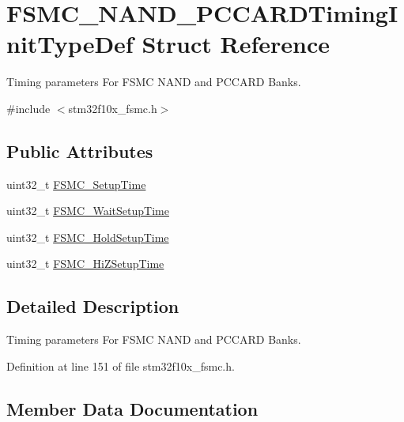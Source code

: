 \hypertarget{struct_f_s_m_c___n_a_n_d___p_c_c_a_r_d_timing_init_type_def}{}\section{F\+S\+M\+C\+\_\+\+N\+A\+N\+D\+\_\+\+P\+C\+C\+A\+R\+D\+Timing\+Init\+Type\+Def Struct Reference}
\label{struct_f_s_m_c___n_a_n_d___p_c_c_a_r_d_timing_init_type_def}


Timing parameters For F\+S\+MC N\+A\+ND and P\+C\+C\+A\+RD Banks.  




{\ttfamily \#include $<$stm32f10x\+\_\+fsmc.\+h$>$}

\subsection*{Public Attributes}
\begin{DoxyCompactItemize}
\item 
uint32\+\_\+t \hyperlink{struct_f_s_m_c___n_a_n_d___p_c_c_a_r_d_timing_init_type_def_a31632aeb49269a29a39e3b191590b6dc}{F\+S\+M\+C\+\_\+\+Setup\+Time}
\item 
uint32\+\_\+t \hyperlink{struct_f_s_m_c___n_a_n_d___p_c_c_a_r_d_timing_init_type_def_a99a7d54ed2674faa5a4e0f2669812855}{F\+S\+M\+C\+\_\+\+Wait\+Setup\+Time}
\item 
uint32\+\_\+t \hyperlink{struct_f_s_m_c___n_a_n_d___p_c_c_a_r_d_timing_init_type_def_ae2b53c2cfd55ff277f453613dcf7c8b2}{F\+S\+M\+C\+\_\+\+Hold\+Setup\+Time}
\item 
uint32\+\_\+t \hyperlink{struct_f_s_m_c___n_a_n_d___p_c_c_a_r_d_timing_init_type_def_a8a2a2a9e71dbf276fddad2bb32c0d256}{F\+S\+M\+C\+\_\+\+Hi\+Z\+Setup\+Time}
\end{DoxyCompactItemize}


\subsection{Detailed Description}
Timing parameters For F\+S\+MC N\+A\+ND and P\+C\+C\+A\+RD Banks. 

Definition at line 151 of file stm32f10x\+\_\+fsmc.\+h.



\subsection{Member Data Documentation}
\mbox{\label{struct_f_s_m_c___n_a_n_d___p_c_c_a_r_d_timing_init_type_def_a8a2a2a9e71dbf276fddad2bb32c0d256}} 
